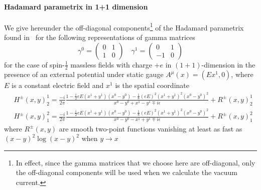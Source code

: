 \paragraph{Hadamard parametrix in 1+1 dimension}
We give hereunder the off-diagonal components\footnote{
In effect, since the gamma matrices that we choose here are off-diagonal, only the off-diagonal components will be used when we calculate the vacuum current.
}
 of the Hadamard parametrix found in~\cite{Zahn2015} for the following representations of gamma matrices
\begin{equation*}
\gamma^0 = \begin{pmatrix}
0 & 1 \\
1 & 0 \end{pmatrix}  \quad  \gamma^1 = \begin{pmatrix}
0  & 1 \\
-1 & 0
\end{pmatrix}
\end{equation*}
for the case of spin-$\frac 1 2$ massless fields with charge $+e$ in $(1+1)$-dimension in the presence of an external potential under static gauge $A^\mu(x) = (Ex^1, 0)$, where $E$ is a constant electric field and $x^1$ is the spatial coordinate
\begin{equation}\label{vacuum-hadamardparametrix}
\begin{split}
& H^\pm (x, y)^1_2 = \frac{-i}{2\pi}\frac{1-\frac i 2 e E(x^1 + y^1)(x^0-y^0) 
- \frac 1 8 (eE)^2(x^1 + y^1)^2(x^0 - y^0)^2}{x^0 - y^0 + x^1 - y^1 \mp i \epsilon}  + R^\pm(x,y)^{1}_2\\
& H^\pm (x, y)^2_1 = \frac{-i}{2\pi}\frac{1-\frac i 2 e E(x^1 + y^1)(x^0-y^0) 
- \frac 1 8 (eE)^2(x^1 + y^1)^2(x^0 - y^0)^2}{x^0 - y^0 - x^1 + y^1 \mp i \epsilon} + R^\pm(x,y)^{2}_1
\end{split}
\end{equation}
where $R^\pm(x,y)$ are smooth two-point functions vanishing at least as fast as $(x-y)^2 \log(x-y)^2$  when $y\rightarrow x$

















